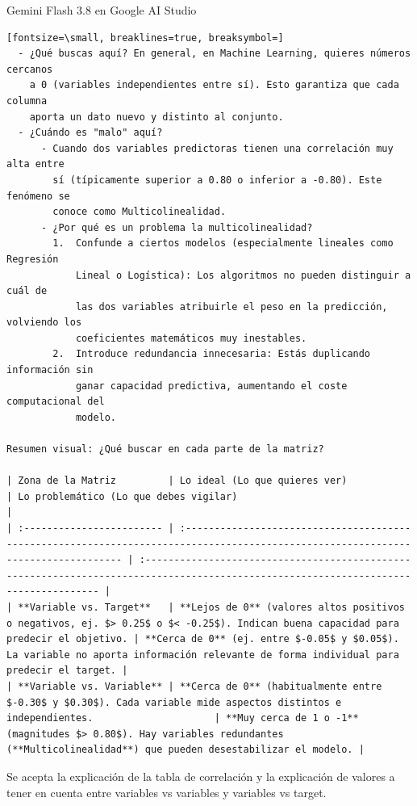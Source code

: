 \documentclass[12pt,a4paper,oneside]{book}
\begin{document}
\begin{iaresp}{Gemini Flash 3.8 en Google AI Studio}
\begin{Verbatim}[fontsize=\small, breaklines=true, breaksymbol=]
  - ¿Qué buscas aquí? En general, en Machine Learning, quieres números cercanos
    a 0 (variables independientes entre sí). Esto garantiza que cada columna
    aporta un dato nuevo y distinto al conjunto.
  - ¿Cuándo es "malo" aquí?
      - Cuando dos variables predictoras tienen una correlación muy alta entre
        sí (típicamente superior a 0.80 o inferior a -0.80). Este fenómeno se
        conoce como Multicolinealidad.
      - ¿Por qué es un problema la multicolinealidad?
        1.  Confunde a ciertos modelos (especialmente lineales como Regresión
            Lineal o Logística): Los algoritmos no pueden distinguir a cuál de
            las dos variables atribuirle el peso en la predicción, volviendo los
            coeficientes matemáticos muy inestables.
        2.  Introduce redundancia innecesaria: Estás duplicando información sin
            ganar capacidad predictiva, aumentando el coste computacional del
            modelo.

Resumen visual: ¿Qué buscar en cada parte de la matriz?

| Zona de la Matriz         | Lo ideal (Lo que quieres ver)                                                                                                      | Lo problemático (Lo que debes vigilar)                                                                                                |
| :------------------------ | :--------------------------------------------------------------------------------------------------------------------------------- | :------------------------------------------------------------------------------------------------------------------------------------ |
| **Variable vs. Target**   | **Lejos de 0** (valores altos positivos o negativos, ej. $> 0.25$ o $< -0.25$). Indican buena capacidad para predecir el objetivo. | **Cerca de 0** (ej. entre $-0.05$ y $0.05$). La variable no aporta información relevante de forma individual para predecir el target. |
| **Variable vs. Variable** | **Cerca de 0** (habitualmente entre $-0.30$ y $0.30$). Cada variable mide aspectos distintos e independientes.                     | **Muy cerca de 1 o -1** (magnitudes $> 0.80$). Hay variables redundantes (**Multicolinealidad**) que pueden desestabilizar el modelo. |
\end{Verbatim}
\end{iaresp}
\begin{iaanalisis}
Se acepta la explicación de la tabla de correlación y la explicación de valores a tener en cuenta entre variables vs variables y variables vs target.
\end{iaanalisis}
\end{document}
